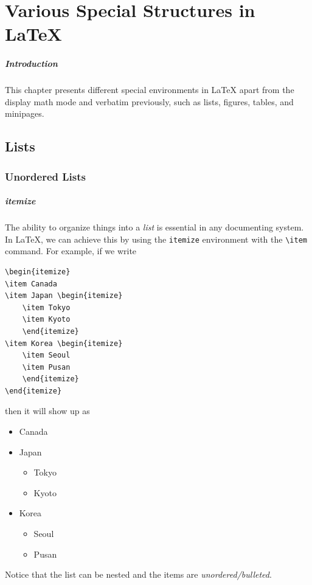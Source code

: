 \chapter{Various Special Structures in \LaTeX{}}

\paragraph{Introduction}
This chapter presents different special environments in \LaTeX{} apart from the display math mode and verbatim previously, such as lists, figures, tables, and minipages.

\section{Lists}

\subsection{Unordered Lists}

\paragraph{itemize}
The ability to organize things into a \textit{list} is essential in any documenting system. In \LaTeX{}, we can achieve this by using the \verb|itemize| environment with the \texttt{\textbackslash item} command. For example, if we write
\begin{lstlisting}
\begin{itemize}
\item Canada
\item Japan \begin{itemize}
    \item Tokyo
    \item Kyoto
    \end{itemize}
\item Korea \begin{itemize}
    \item Seoul
    \item Pusan
    \end{itemize}
\end{itemize}  
\end{lstlisting}
then it will show up as
\begin{itemize}
\item Canada
\item Japan \begin{itemize}
    \item Tokyo
    \item Kyoto
    \end{itemize}
\item Korea \begin{itemize}
    \item Seoul
    \item Pusan
    \end{itemize}
\end{itemize}  
Notice that the list can be nested and the items are \textit{unordered/bulleted}.

